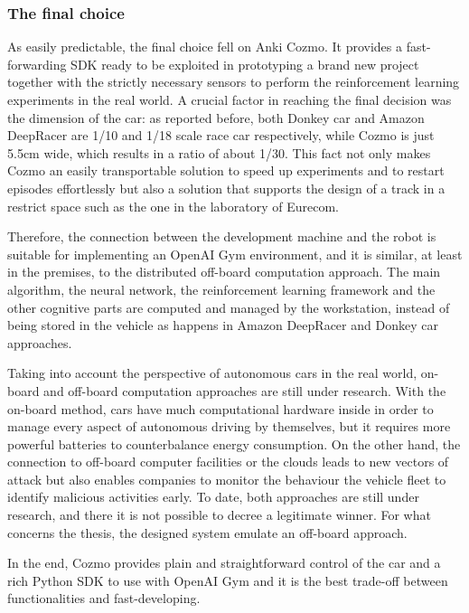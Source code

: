\subsubsection{The final choice}

As easily predictable, the final choice fell on Anki Cozmo. It provides a fast-forwarding SDK ready to be exploited in prototyping a brand new project together with the strictly necessary sensors to perform the reinforcement learning experiments in the real world.
A crucial factor in reaching the final decision was the dimension of the car: as reported before, both Donkey car and Amazon DeepRacer are 1/10 and 1/18 scale race car respectively, while Cozmo is just 5.5cm wide, which results in a ratio of about 1/30. This fact not only makes Cozmo an easily transportable solution to speed up experiments and to restart episodes effortlessly but also a solution that supports the design of a track in a restrict space such as the one in the laboratory of Eurecom.

Therefore, the connection between the development machine and the robot is suitable for implementing an OpenAI Gym environment, and it is similar, at least in the premises, to the distributed off-board computation approach. The main algorithm, the neural network, the reinforcement learning framework and the other cognitive parts are computed and managed by the workstation, instead of being stored in the vehicle as happens in Amazon DeepRacer and Donkey car approaches.

Taking into account the perspective of autonomous cars in the real world, on-board and off-board computation approaches are still under research. With the on-board method, cars have much computational hardware inside in order to manage every aspect of autonomous driving by themselves, but it requires more powerful batteries to counterbalance energy consumption. On the other hand, the connection to off-board computer facilities or the clouds leads to new vectors of attack but also enables companies to monitor the behaviour the vehicle fleet to identify malicious activities early.
To date, both approaches are still under research, and there it is not possible to decree a legitimate winner. For what concerns the thesis, the designed system emulate an off-board approach.

In the end, Cozmo provides plain and straightforward control of the car and a rich Python SDK to use with OpenAI Gym and it is the best trade-off between functionalities and fast-developing. 


